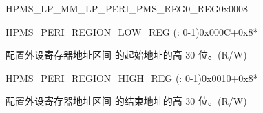 \begin{register}{H}{PMS\_LP\_MM\_LP\_PERI\_PMS\_REG0\_REG}{0x0008}
\begin{regdesc}
\begin{reglist}
\end{reglist}\end{regdesc}
\end{register}


\begin{register}{H}{PMS\_PERI\_REGION\_LOW\_REG (: 0-1)}{0x000C+0x8*}\label{regdesc:PMSPERIREGIONNLOWREG}
%
%
\regnewline%
\begin{regdesc}\begin{reglist}
\label{fielddesc:PMSPERIREGIONNLOW}\item [PMS\_PERI\_REGION\regindex{n}\_LOW] 配置外设寄存器地址区间  的起始地址的高 30 位。(R/W)
\end{reglist}\end{regdesc}
\end{register}


\begin{register}{H}{PMS\_PERI\_REGION\_HIGH\_REG (: 0-1)}{0x0010+0x8*}\label{regdesc:PMSPERIREGIONNHIGHREG}
%
%
\regnewline%
\begin{regdesc}\begin{reglist}
\label{fielddesc:PMSPERIREGIONNHIGH}\item [PMS\_PERI\_REGION\regindex{n}\_HIGH] 配置外设寄存器地址区间  的结束地址的高 30 位。(R/W)
\end{reglist}\end{regdesc}
\end{register}


